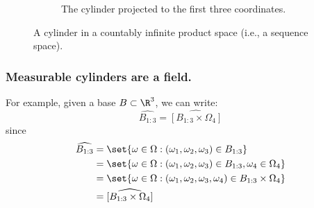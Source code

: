 \documentclass{article} %
\newcommand{\cylinder}[1]{\widehat{#1}}
\begin{document}
\begin{example}
\begin{figure}
\begin{subfigure}[b]{0.45\textwidth}
         \caption{The cylinder projected to the first three coordinates.}
\label{fig:cylinder_projected_to_first_three_coordinates}
     \end{subfigure}
     \hfill
 \caption{A cylinder in a countably infinite product space (i.e., a sequence space).}
\label{fig:cylinders_in_sequence_space}
\end{figure}

\end{example}

\subsubsection{Measurable cylinders are a field.}

\begin{remark}{}
For example, given a base $B \subset \R^3$, we can write:
\[ \cylinder{B_{1:3}} = \cylinder{[B_{1:3} \times \Omega_4]} \]
since
\begin{align*}
\cylinder{B_{1:3}} &=\set{\omega \in \Omega : (\omega_1, \omega_2, \omega_3) \in B_{1:3}} \\
&=\set{\omega \in \Omega : (\omega_1, \omega_2, \omega_3) \in B_{1:3}, \omega_4 \in \Omega_4} \\
&=\set{\omega \in \Omega : (\omega_1, \omega_2, \omega_3, \omega_4) \in B_{1:3} \times \Omega_4} \\	
&= \cylinder{[B_{1:3} \times \Omega_4]} 
\end{align*}
\label{rk:cylinder_can_always_be_regarded_as_having_a_higher_dimensional_base}
\end{remark}


\end{document}
